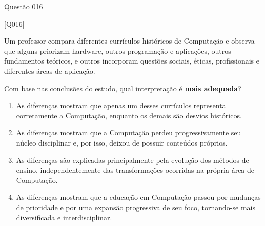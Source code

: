 \documentclass[xcolor=dvipsnames,table]{beamer}
\begin{document}
{\logo{}
\begin{frame}{Questão 016}

    \footnotesize

    \begin{block}{[Q016]}

    Um professor compara diferentes currículos históricos de Computação e observa que alguns priorizam hardware, outros programação e aplicações, outros fundamentos teóricos, e outros incorporam questões sociais, éticas, profissionais e diferentes áreas de aplicação.

    Com base nas conclusões do estudo, qual interpretação é \textbf{mais adequada}?

    \end{block}

    \begin{enumerate}[label=(\Alph*)]

        \item As diferenças mostram que apenas um desses currículos representa corretamente a Computação, enquanto os demais são desvios históricos.

        \item As diferenças mostram que a Computação perdeu progressivamente seu núcleo disciplinar e, por isso, deixou de possuir conteúdos próprios.

        \item As diferenças são explicadas principalmente pela evolução dos métodos de ensino, independentemente das transformações ocorridas na própria área de Computação.
        
        \item As diferenças mostram que a educação em Computação passou por mudanças de prioridade e por uma expansão progressiva de seu foco, tornando-se mais diversificada e interdisciplinar.

    \end{enumerate}

\end{frame}
}
	
\begin{frame}
		\titlepage
	\end{frame}
	
\end{document}
